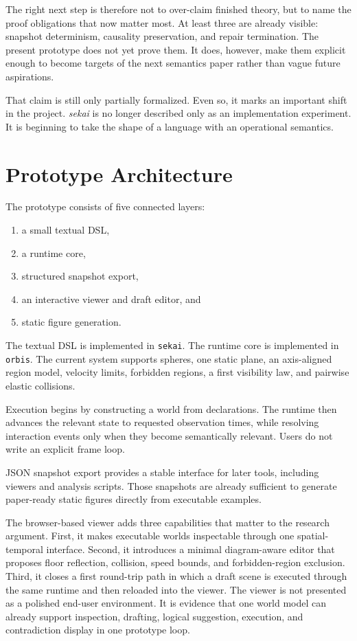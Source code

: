 The right next step is therefore not to over-claim finished theory, but to name the proof obligations that now matter most.
At least three are already visible:
snapshot determinism, causality preservation, and repair termination.
The present prototype does not yet prove them.
It does, however, make them explicit enough to become targets of the next semantics paper rather than vague future aspirations.

That claim is still only partially formalized.
Even so, it marks an important shift in the project.
\emph{sekai} is no longer described only as an implementation experiment.
It is beginning to take the shape of a language with an operational semantics.

\section{Prototype Architecture}

The prototype consists of five connected layers:
\begin{enumerate}
\item a small textual DSL,
\item a runtime core,
\item structured snapshot export,
\item an interactive viewer and draft editor, and
\item static figure generation.
\end{enumerate}

The textual DSL is implemented in \texttt{sekai}.
The runtime core is implemented in \texttt{orbis}.
The current system supports spheres, one static plane, an axis-aligned region model, velocity limits, forbidden regions, a first visibility law, and pairwise elastic collisions.

Execution begins by constructing a world from declarations.
The runtime then advances the relevant state to requested observation times, while resolving interaction events only when they become semantically relevant.
Users do not write an explicit frame loop.

JSON snapshot export provides a stable interface for later tools, including viewers and analysis scripts.
Those snapshots are already sufficient to generate paper-ready static figures directly from executable examples.

The browser-based viewer adds three capabilities that matter to the research argument.
First, it makes executable worlds inspectable through one spatial-temporal interface.
Second, it introduces a minimal diagram-aware editor that proposes floor reflection, collision, speed bounds, and forbidden-region exclusion.
Third, it closes a first round-trip path in which a draft scene is executed through the same runtime and then reloaded into the viewer.
The viewer is not presented as a polished end-user environment.
It is evidence that one world model can already support inspection, drafting, logical suggestion, execution, and contradiction display in one prototype loop.

